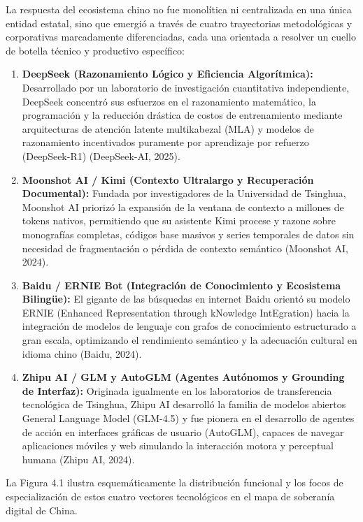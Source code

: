 La respuesta del ecosistema chino no fue monolítica ni centralizada en una única entidad estatal, sino que emergió a través de cuatro trayectorias metodológicas y corporativas marcadamente diferenciadas, cada una orientada a resolver un cuello de botella técnico y productivo específico:

\begin{enumerate}[label=\textbf{\arabic*.}]
    \item \textbf{DeepSeek (Razonamiento Lógico y Eficiencia Algorítmica):} Desarrollado por un laboratorio de investigación cuantitativa independiente, DeepSeek concentró sus esfuerzos en el razonamiento matemático, la programación y la reducción drástica de costos de entrenamiento mediante arquitecturas de atención latente multikabezal (MLA) y modelos de razonamiento incentivados puramente por aprendizaje por refuerzo (DeepSeek-R1) (DeepSeek-AI, 2025).
    \item \textbf{Moonshot AI / Kimi (Contexto Ultralargo y Recuperación Documental):} Fundada por investigadores de la Universidad de Tsinghua, Moonshot AI priorizó la expansión de la ventana de contexto a millones de tokens nativos, permitiendo que su asistente Kimi procese y razone sobre monografías completas, códigos base masivos y series temporales de datos sin necesidad de fragmentación o pérdida de contexto semántico (Moonshot AI, 2024).
    \item \textbf{Baidu / ERNIE Bot (Integración de Conocimiento y Ecosistema Bilingüe):} El gigante de las búsquedas en internet Baidu orientó su modelo ERNIE (Enhanced Representation through kNowledge IntEgration) hacia la integración de modelos de lenguaje con grafos de conocimiento estructurado a gran escala, optimizando el rendimiento semántico y la adecuación cultural en idioma chino (Baidu, 2024).
    \item \textbf{Zhipu AI / GLM y AutoGLM (Agentes Autónomos y Grounding de Interfaz):} Originada igualmente en los laboratorios de transferencia tecnológica de Tsinghua, Zhipu AI desarrolló la familia de modelos abiertos General Language Model (GLM-4.5) y fue pionera en el desarrollo de agentes de acción en interfaces gráficas de usuario (AutoGLM), capaces de navegar aplicaciones móviles y web simulando la interacción motora y perceptual humana (Zhipu AI, 2024).
\end{enumerate}

La Figura 4.1 ilustra esquemáticamente la distribución funcional y los focos de especialización de estos cuatro vectores tecnológicos en el mapa de soberanía digital de China.

